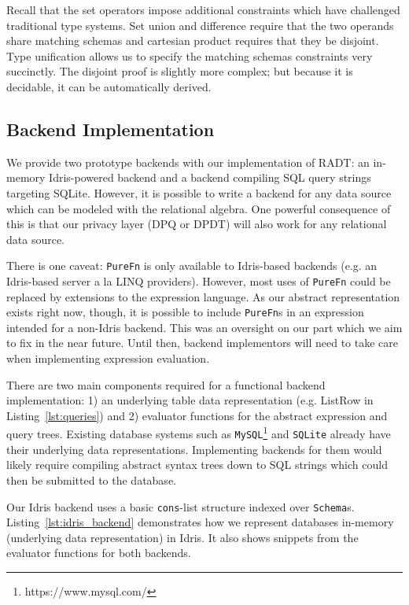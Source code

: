 \documentclass[12pt]{report}
\begin{document}
Recall that the set operators impose additional constraints which have challenged traditional type systems.
Set union and difference require that the two operands share matching schemas and cartesian product requires that they be disjoint.
Type unification allows us to specify the matching schemas constraints very succinctly.
The disjoint proof is slightly more complex; but because it is decidable, it can be automatically derived.

\subsection{Backend Implementation}

We provide two prototype backends with our implementation of RADT: an in-memory Idris-powered backend and a backend compiling SQL query strings targeting SQLite.
However, it is possible to write a backend for any data source which can be modeled with the relational algebra.
One powerful consequence of this is that our privacy layer (DPQ or DPDT) will also work for any relational data source.

There is one caveat: \texttt{PureFn} is only available to Idris-based backends (e.g. an Idris-based server a la LINQ providers).
However, most uses of \texttt{PureFn} could be replaced by extensions to the expression language.
As our abstract representation exists right now, though, it is possible to include \texttt{PureFn}s in an expression intended for a non-Idris backend.
This was an oversight on our part which we aim to fix in the near future.
Until then, backend implementors will need to take care when implementing expression evaluation.

There are two main components required for a functional backend implementation:
1) an underlying table data representation (e.g. ListRow in Listing~\ref{lst:queries}) and
2) evaluator functions for the abstract expression and query trees.
Existing database systems such as \texttt{MySQL}\footnote{https://www.mysql.com/} and \texttt{SQLite} already have their underlying data representations.
Implementing backends for them would likely require compiling abstract syntax trees down to SQL strings which could then be submitted to the database.

Our Idris backend uses a basic \texttt{cons}-list structure indexed over \texttt{Schema}s.
Listing~\ref{lst:idris_backend} demonstrates how we represent databases in-memory (underlying data representation) in Idris.
It also shows snippets from the evaluator functions for both backends.
\end{document}
